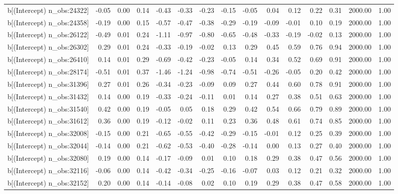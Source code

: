 \begin{table}[ht]
\begin{tabular}{rrrrrrrrrrrrrrr}
  b[(Intercept) n\_obs:24322] & -0.05 & 0.00 & 0.14 & -0.43 & -0.33 & -0.23 & -0.15 & -0.05 & 0.04 & 0.12 & 0.22 & 0.31 & 2000.00 & 1.00 \\ 
  b[(Intercept) n\_obs:24358] & -0.19 & 0.00 & 0.15 & -0.57 & -0.47 & -0.38 & -0.29 & -0.19 & -0.09 & -0.01 & 0.10 & 0.19 & 2000.00 & 1.00 \\ 
  b[(Intercept) n\_obs:26122] & -0.49 & 0.01 & 0.24 & -1.11 & -0.97 & -0.80 & -0.65 & -0.48 & -0.33 & -0.19 & -0.02 & 0.13 & 2000.00 & 1.00 \\ 
  b[(Intercept) n\_obs:26302] & 0.29 & 0.01 & 0.24 & -0.33 & -0.19 & -0.02 & 0.13 & 0.29 & 0.45 & 0.59 & 0.76 & 0.94 & 2000.00 & 1.00 \\ 
  b[(Intercept) n\_obs:26410] & 0.14 & 0.01 & 0.29 & -0.69 & -0.42 & -0.23 & -0.05 & 0.14 & 0.34 & 0.52 & 0.69 & 0.91 & 2000.00 & 1.00 \\ 
  b[(Intercept) n\_obs:28174] & -0.51 & 0.01 & 0.37 & -1.46 & -1.24 & -0.98 & -0.74 & -0.51 & -0.26 & -0.05 & 0.20 & 0.42 & 2000.00 & 1.00 \\ 
  b[(Intercept) n\_obs:31396] & 0.27 & 0.01 & 0.26 & -0.34 & -0.23 & -0.09 & 0.09 & 0.27 & 0.44 & 0.60 & 0.78 & 0.91 & 2000.00 & 1.00 \\ 
  b[(Intercept) n\_obs:31432] & 0.14 & 0.00 & 0.19 & -0.33 & -0.24 & -0.11 & 0.01 & 0.14 & 0.27 & 0.38 & 0.51 & 0.63 & 2000.00 & 1.00 \\ 
  b[(Intercept) n\_obs:31540] & 0.42 & 0.00 & 0.19 & -0.05 & 0.05 & 0.18 & 0.29 & 0.42 & 0.54 & 0.66 & 0.79 & 0.89 & 2000.00 & 1.00 \\ 
  b[(Intercept) n\_obs:31612] & 0.36 & 0.00 & 0.19 & -0.12 & -0.02 & 0.11 & 0.23 & 0.36 & 0.48 & 0.61 & 0.74 & 0.85 & 2000.00 & 1.00 \\ 
  b[(Intercept) n\_obs:32008] & -0.15 & 0.00 & 0.21 & -0.65 & -0.55 & -0.42 & -0.29 & -0.15 & -0.01 & 0.12 & 0.25 & 0.39 & 2000.00 & 1.00 \\ 
  b[(Intercept) n\_obs:32044] & -0.14 & 0.00 & 0.21 & -0.62 & -0.53 & -0.40 & -0.28 & -0.14 & 0.00 & 0.13 & 0.27 & 0.40 & 2000.00 & 1.00 \\ 
  b[(Intercept) n\_obs:32080] & 0.19 & 0.00 & 0.14 & -0.17 & -0.09 & 0.01 & 0.10 & 0.18 & 0.29 & 0.38 & 0.47 & 0.56 & 2000.00 & 1.00 \\ 
  b[(Intercept) n\_obs:32116] & -0.06 & 0.00 & 0.14 & -0.42 & -0.34 & -0.25 & -0.16 & -0.07 & 0.03 & 0.12 & 0.21 & 0.32 & 2000.00 & 1.00 \\ 
  b[(Intercept) n\_obs:32152] & 0.20 & 0.00 & 0.14 & -0.14 & -0.08 & 0.02 & 0.10 & 0.19 & 0.29 & 0.38 & 0.47 & 0.58 & 2000.00 & 1.00 \\ 

\end{tabular}
\end{table}

